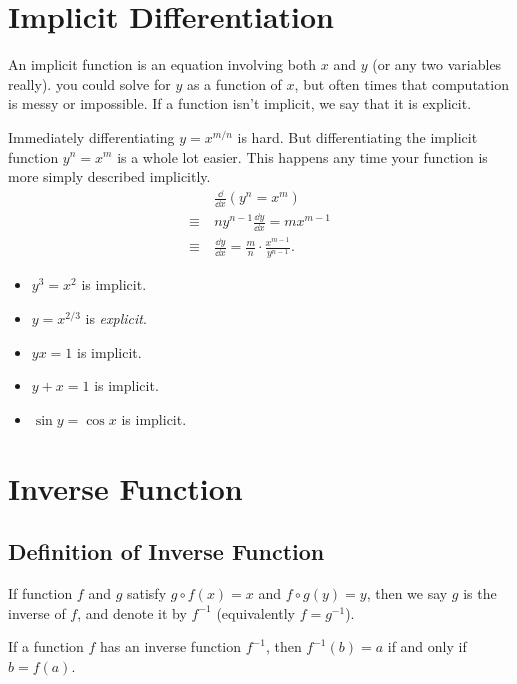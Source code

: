 \section{Implicit Differentiation}
\begin{note} An implicit function is an equation involving both $x$ and $y$ (or any two variables really). you could solve for $y$ as a function of $x$, but often times that computation is messy or impossible. If a function isn't implicit, we say that it is explicit.
\end{note}

Immediately differentiating $y=x^{m/n}$ is hard. But differentiating the implicit function $y^n=x^m$ is a whole lot easier. This happens any time your function is more simply described implicitly.
\begin{align*}
  \phantom{\equiv}\ & \frac{\dd }{\dd x}(y^n=x^m)\\
            \equiv\ & ny^{n-1}\frac{\dd y}{\dd x}=mx^{m-1}\\
            \equiv\ & \frac{\dd y}{\dd x}=\frac m n\cdot\frac{x^{m-1}}{y^{n-1}}.
\end{align*}
\begin{eg}
  \leavevmode
  \begin{itemize}
    \item$y^3=x^2$ is implicit.
    \item$y=x^{2/3}$ is \textit{explicit}.
    \item$yx=1$ is implicit.
    \item$y+x=1$ is implicit.
    \item$\sin y=\cos x$ is implicit.
  \end{itemize}
\end{eg}

\section{Inverse Function}
\subsection{Definition of Inverse Function}
If function $f$ and $g$ satisfy $g\circ f(x)=x$ and $f\circ g(y)=y$, then we say $g$ is the inverse of $f$, and denote it by $f^{-1}$ (equivalently $f=g^{-1}$). 

If a function $f$ has an inverse function $f^{-1}$, then $f^{-1}(b)=a$ if and only if $b=f(a)$.

